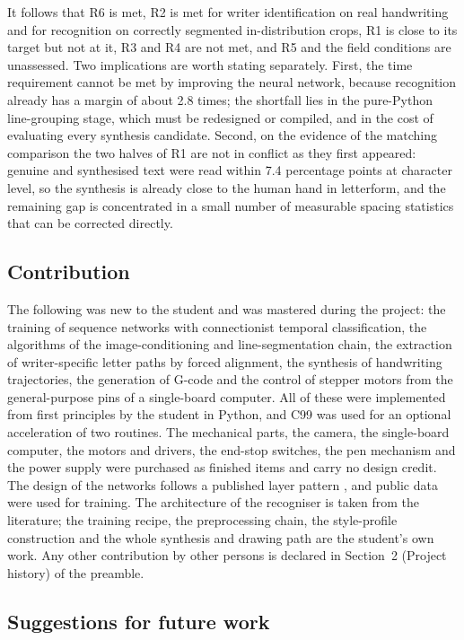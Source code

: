 It follows that R6 is met, R2 is met for writer identification on real handwriting and for recognition on correctly segmented in-distribution crops, R1 is close to its target but not at it, R3 and R4 are not met, and R5 and the field conditions are unassessed.
Two implications are worth stating separately.
First, the time requirement cannot be met by improving the neural network, because recognition already has a margin of about 2.8 times; the shortfall lies in the pure-Python line-grouping stage, which must be redesigned or compiled, and in the cost of evaluating every synthesis candidate.
Second, on the evidence of the matching comparison the two halves of R1 are not in conflict as they first appeared: genuine and synthesised text were read within 7.4 percentage points at character level, so the synthesis is already close to the human hand in letterform, and the remaining gap is concentrated in a small number of measurable spacing statistics that can be corrected directly.


\subsection{Contribution}
\label{sec:con-contribution}

The following was new to the student and was mastered during the project: the training of sequence networks with connectionist temporal classification, the algorithms of the image-conditioning and line-segmentation chain, the extraction of writer-specific letter paths by forced alignment, the synthesis of handwriting trajectories, the generation of G-code and the control of stepper motors from the general-purpose pins of a single-board computer.
All of these were implemented from first principles by the student in Python, and C99 was used for an optional acceleration of two routines.
The mechanical parts, the camera, the single-board computer, the motors and drivers, the end-stop switches, the pen mechanism and the power supply were purchased as finished items and carry no design credit.
The design of the networks follows a published layer pattern \cite{kizilirmak2023}, and public data were used for training.
The architecture of the recogniser is taken from the literature; the training recipe, the preprocessing chain, the style-profile construction and the whole synthesis and drawing path are the student's own work.
Any other contribution by other persons is declared in Section~2 (Project history) of the preamble.


\subsection{Suggestions for future work}
\label{sec:con-future}

